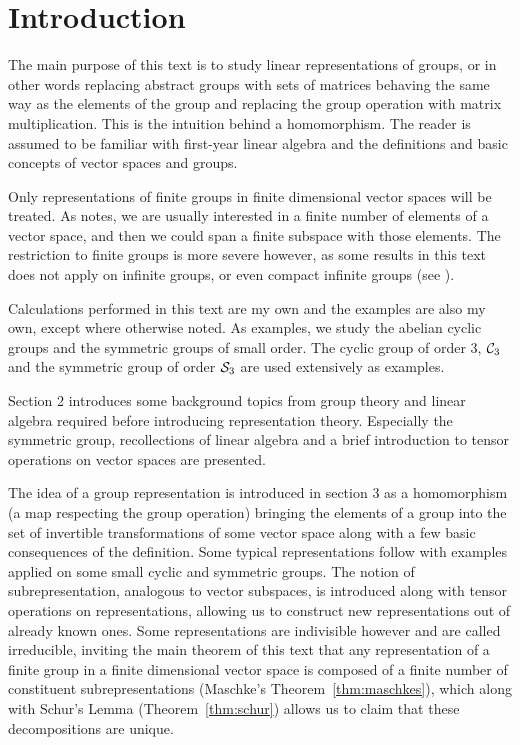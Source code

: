 \clearpage{\thispagestyle{empty}}
\section{Introduction}

	The main purpose of this text is to study linear representations of groups, or in other words replacing abstract groups with sets of matrices behaving the same way as the elements of the group and replacing the group operation with matrix multiplication. This is the intuition behind a homomorphism. The reader is assumed to be familiar with first-year linear algebra and the definitions and basic concepts of vector spaces and groups.
	
	Only representations of finite groups in finite dimensional vector spaces will be treated. As \cite[Sect.1.1.]{Serre} notes, we are usually interested in a finite number of elements of a vector space, and then we could span a finite subspace with those elements. The restriction to finite groups is more severe however, as some results in this text does not apply on infinite groups, or even compact infinite groups (see \cite{FultonHarris, Serre}). 
	
	Calculations performed in this text are my own and the examples are also my own, except where otherwise noted. As examples, we study the abelian cyclic groups and the symmetric groups of small order. The cyclic group of order 3, $\mathcal{C}_3$ and the symmetric group of order $\mathcal{S}_3$ are used extensively as examples.
	
	Section 2 introduces some background topics from group theory and linear algebra required before introducing representation theory. Especially the symmetric group, recollections of linear algebra and a brief introduction to tensor operations on vector spaces are presented.
	
	The idea of a group representation is introduced in section 3 as a homomorphism (a map respecting the group operation) bringing the elements of a group into the set of invertible transformations of some vector space along with a few basic consequences of the definition. Some typical representations follow with examples applied on some small cyclic and symmetric groups. The notion of subrepresentation, analogous to vector subspaces, is introduced along with tensor operations on representations, allowing us to construct new representations out of already known ones. Some representations are indivisible however and are called irreducible, inviting the main theorem of this text that any representation of a finite group in a finite dimensional vector space is composed of a finite number of constituent subrepresentations (Maschke's Theorem~\ref{thm:maschkes}), which along with Schur's Lemma (Theorem~\ref{thm:schur})  allows us to claim that these decompositions are unique.
	
